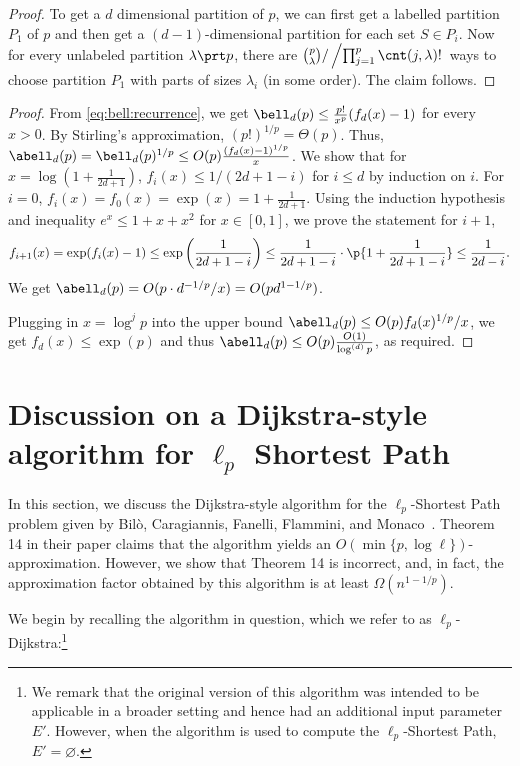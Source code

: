 \documentclass[11pt,a4paper]{article}
\begin{document}
\bellRecurrence*
\begin{proof}
To get a $d$ dimensional partition of $p$, we can first get a labelled partition $P_1$ of $p$ and then get a $(d-1)$-dimensional partition for each set $S\in P_i$. Now for every unlabeled partition $\lambda \prt p$, there are $\binom{p}{\lambda} / \left/ \prod_{j=1}^p \cnt(j, \lambda)!\right.$ ways to choose partition $P_1$ with parts of sizes $\lambda_i$ (in some order). The claim follows.
\end{proof}

\bellNumberAsymptotics*
\begin{proof}
From \eqref{eq:bell:recurrence}, we get $\bell_d(p) \leq \frac{p!}{x^p} (f_d(x) - 1)$ for every $x > 0$. By Stirling's approximation, $(p!)^{1/p} = \Theta(p)$. Thus, $\abell_d(p) = \bell_d(p)^{1/p} \leq O(p)\frac{(f_d(x)-1)^{1/p}}{x}$. We show that for $x = \log(1 + \frac{1}{2d+1})$, $f_i(x)\leq 1/(2d+1 -i)$ for $i\leq d$ by induction on $i$.
For $i=0$, $f_i(x) = f_0(x) = \exp(x) = 1 + \frac{1}{2d+1}$. Using the induction hypothesis and inequality $e^x \leq 1+ x+x^2$ for $x\in[0,1]$, we prove the statement for $i+1$,
$$f_{i+1}(x) = \exp(f_{i}(x) - 1) \leq \exp\left(\frac{1}{2d+1-i}\right) \leq 
\frac{1}{2d+1-i} \cdot \p{1+ \frac{1}{2d+1-i}} \leq \frac{1}{2d-i}.
$$
We get $\abell_d(p) = O(p\cdot d^{-1/p}/x) = O(pd^{1-1/p})$. 

Plugging in $x= \log^{j} p$ into the upper bound $\abell_d(p) \leq O(p) f_d(x)^{1/p}/x$, we get $f_d(x) \leq \exp(p)$ and thus $\abell_d(p) \leq O(p)\frac{O(1)}{\log^{(d)} p}$, as required.
\end{proof}

\section{Discussion on a Dijkstra-style algorithm for \texorpdfstring{$\ell_p$}{l-p} Shortest Path}\label{sec:dijkstra}
In this section, we discuss the Dijkstra-style algorithm for the $\ell_p$-Shortest Path problem given by Bilò, Caragiannis, Fanelli, Flammini, and Monaco~\cite{bilo2017simple}. Theorem 14 in their paper claims that the algorithm yields an $O(\min\{p,\log \ell \})$-approximation. However, we show that Theorem 14 is incorrect, and, in fact, the approximation factor obtained by this algorithm is at least $\Omega(n^{1-1/p})$.

We begin by recalling the algorithm in question, which we refer to as $\ell_p$-Dijkstra:\footnote{We remark that the original version of this algorithm was intended to be applicable in a broader setting and hence had an additional input parameter $E'$. However, when the algorithm is used to compute the $\ell_p$-Shortest Path, $E'=\varnothing$.}
\end{document}
